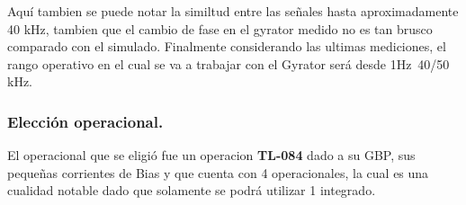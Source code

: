 \documentclass[a4paper]{article}
\begin{document}
 Aquí tambien se puede notar la similtud entre las señales hasta aproximadamente 40 kHz, tambien que el cambio de fase en el gyrator medido no es tan brusco comparado  con el simulado.
Finalmente considerando las ultimas mediciones, el rango operativo en el cual se va  a trabajar con el Gyrator será desde 1Hz~40/50 kHz.
\subsubsection{Elección operacional.}
El operacional que se eligió fue un operacion \textbf{TL-084} dado a su GBP, sus pequeñas corrientes de Bias y que cuenta con 4 operacionales, la cual es una cualidad notable dado que solamente se podrá utilizar 1 integrado.

 \flushleft
\end{document}
